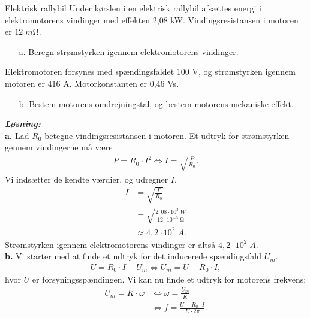 \documentclass{report}
\newcommand{\sol}{\setlength{\parindent}{0cm}\textbf{\textit{Løsning:}}\setlength{\parindent}{1cm}}
\begin{document}
\begin{question}{Elektrisk rallybil}{}
  Under kørslen i en elektrisk rallybil afsættes energi i elektromotorens vindinger med effekten 2,08 kW.
  Vindingsresistansen i motoren er $12 \;\unit{m\ohm}$.
  \begin{itemize}
    \item[a.] Beregn strømstyrken igennem elektromotorens vindinger.
  \end{itemize}
Elektromotoren forsynes med spændingsfaldet 100 V, og strømstyrken igennem motoren er 416 A. Motorkonstanten er 0,46 Vs.
\begin{itemize}
  \item[b.] Bestem motorens omdrejningstal, og bestem motorens mekaniske effekt.
\end{itemize}
\end{question}
\sol \\
\textbf{a.}
Lad $R_0$ betegne vindingsresistansen i motoren.
Et udtryk for strømstyrken gennem vindingerne må være
\begin{equation*}
\begin{split}
P=R_0 \cdot I^2 \iff I=\sqrt{\frac{P}{R_0}}.
\end{split}
\end{equation*}
Vi indsætter de kendte værdier, og udregner $I$.
\begin{equation*}
\begin{split}
  I&=\sqrt{\frac{P}{R_0}}\\
  &=\sqrt{\frac{2,08 \cdot 10^3 \;\unit{W} }{12 \cdot 10 ^{-3} \;\unit{\ohm} }} \\
  &\approx 4,2 \cdot 10^2 \;\unit{A}.
\end{split}
\end{equation*}
Strømstyrken igennem elektromotorens vindinger er altså $4,2 \cdot 10^2 \;\unit{A} $. \\[1ex]
\textbf{b.}
Vi starter med at finde et udtryk for det inducerede spændingsfald $U_m$.
\begin{equation*}
\begin{split}
  U=R_0 \cdot I + U_m \iff U_m=U-R_0 \cdot I,
\end{split}
\end{equation*}
hvor $U$ er forsyningsspændingen. 
Vi kan nu finde et udtryk for motorens frekvens:
\begin{equation*}
\begin{split}
  U_m=K \cdot \omega &\iff \omega =\frac{U_m}{K}\\
  &\iff f =\frac{U-R_0 \cdot I}{K \cdot 2 \pi }.
\end{split}
\end{equation*}
\end{document}
